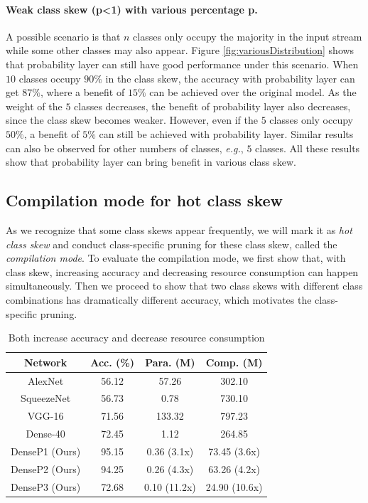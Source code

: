 \documentclass[pageno]{jpaper}
\begin{document}
\paragraph{Weak class skew (p<1) with various percentage p.}
A possible scenario is that $n$ classes only occupy the majority in the input stream while some other classes may also appear. Figure \ref{fig:variousDistribution} shows that probability layer can still have good performance under this scenario. When $10$ classes occupy $90\%$ in the class skew, the accuracy with probability layer can get $87\%$, where a benefit of $15\%$ can be achieved over the original model. As the weight of the $5$ classes decreases, the benefit of probability layer also decreases, since the class skew becomes weaker. However, even if the $5$ classes only occupy $50\%$, a benefit of $5\%$ can still be achieved with probability  layer. Similar results can also be observed for other numbers of classes, \textit{e.g.}, $5$ classes. All these results show that probability layer can bring benefit in various class skew.



\subsection{Compilation mode for hot class skew}
As we recognize that some class skews appear frequently, we will mark it as \textit{hot class skew} and conduct class-specific pruning for these class skew, called the \textit{compilation mode}. To evaluate the compilation mode, we first show that, with class skew, increasing accuracy and decreasing resource consumption can happen simultaneously. Then we proceed to show that two class skews with different class combinations has dramatically different accuracy, which motivates the class-specific pruning. 




\begin{table}
    \caption{Both increase accuracy and decrease resource consumption}
    \label{tab:generalPrune}

    \centering
    \begin{tabular}{ c|c|cc } 
     \hline
     Network & Acc. (\%) & Para. (M) & Comp. (M) \\ 
     \hline
     AlexNet \cite{ahmed2016network, NIPS2012_4824} & 56.12 & 57.26 & 302.10 \\
     SqueezeNet \cite{iandola2016squeezenet} & 56.73 & 0.78 & 730.10 \\
     VGG-16 \cite{simonyan2014very} & 71.56 & 133.32 & 797.23 \\
     Dense-40 \cite{huang2017densely} & 72.45 & 1.12 & 264.85 \\
     \hline
     DenseP1 (Ours)& 95.15 & 0.36 (3.1x) & 73.45 (3.6x) \\
     DenseP2 (Ours)& 94.25 & 0.26 (4.3x) & 63.26 (4.2x)\\
     DenseP3 (Ours)& 72.68 & 0.10 (11.2x) & 24.90 (10.6x)\\
     \hline
    \end{tabular}
\end{table}
\end{document}
